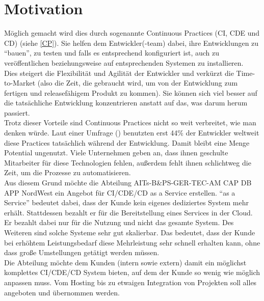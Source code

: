 \section{Motivation}
Möglich gemacht wird dies durch sogenannte Continuous Practices (\ac{CI}, \ac{CDE} und \ac{CD}) (siehe \ref{CP}). Sie helfen dem Entwickler(-team) dabei, ihre Entwicklungen zu \enquote{bauen}, zu testen und falls es entsprechend konfiguriert ist, auch zu veröffentlichen beziehungsweise auf entsprechenden Systemen zu installieren.\\ Dies steigert die Flexibilität und Agilität der Entwickler und verkürzt die Time-to-Market (also die Zeit, die gebraucht wird, um von der Entwicklung zum fertigen und releasefähigem Produkt zu kommen). Sie können sich viel besser auf die tatsächliche Entwicklung konzentrieren anstatt auf das, was darum herum passiert.\\ Trotz dieser Vorteile sind Continuous Practices nicht so weit verbreitet, wie man denken würde. Laut einer Umfrage (\cite{JetBrains.2016}) benutzten erst 44\% der Entwickler weltweit diese Practices tatsächlich während der Entwicklung.\autocite{JetBrains.2016}  Damit bleibt eine Menge Potential ungenutzt. Viele Unternehmen geben an, dass ihnen geschulte Mitarbeiter für diese Technologien fehlen, außerdem fehlt ihnen schlichtweg die Zeit, um die Prozesse zu automatisieren.\autocite{Claranet.2016}\\ Aus diesem Grund möchte die Abteilung AITs-B\&PS-GER-TEC-AM CAP DB APP NordWest ein Angebot für \ac{CI}/\ac{CDE}/\ac{CD} as a Service erstellen. \enquote{as a Service} bedeutet dabei, dass der Kunde kein eigenes dediziertes System mehr erhält. Stattdessen bezahlt er für die Bereitstellung eines Services in der Cloud. Er bezahlt dabei nur für die Nutzung und nicht das gesamte System. Des Weiteren sind solche Systeme sehr gut skalierbar. Das bedeutet, dass der Kunde bei erhöhtem Leistungsbedarf diese Mehrleistung sehr schnell erhalten kann, ohne dass große Umstellungen getätigt werden müssen.\\ Die Abteilung möchte dem Kunden (intern sowie extern) damit ein möglichst komplettes \ac{CI}/\ac{CDE}/\ac{CD} System bieten, auf dem der Kunde so wenig wie möglich anpassen muss. Vom Hosting bis zu etwaigen Integration von Projekten soll alles angeboten und übernommen werden. 
